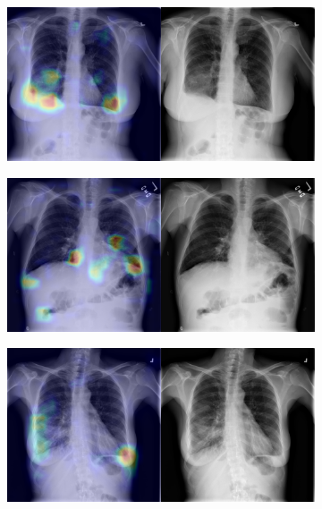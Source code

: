 \begin{figure}[b]
\begin{subfigure}{0.4\textwidth}
    \end{subfigure}
    \begin{subfigure}{0.4\textwidth}
        \centering
        \includegraphics[width=1.0\textwidth]{Chapters/5. Conclusiones/img/Pleural-Thickening/1_1_00002236_000.png}
    \end{subfigure}
    \begin{subfigure}{0.4\textwidth}
        \centering
        \includegraphics[width=1.0\textwidth]{Chapters/5. Conclusiones/img/Pleural-Thickening/1_1_00003996_012.png}
    \end{subfigure}
    \begin{subfigure}{0.4\textwidth}
        \centering
        \includegraphics[width=1.0\textwidth]{Chapters/5. Conclusiones/img/Pleural-Thickening/1_1_00023283_020.png}

\end{subfigure}
\end{figure}
